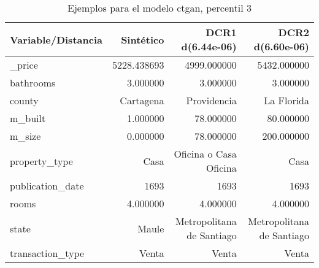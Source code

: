 \begin{table}[H]
\centering
\fontsize{10}{14}\selectfont
\caption{Ejemplos para el modelo ctgan, percentil 3}
\label{table-example-economicos-a-3-ctgan-3p}
\begin{tabular}{|l|r|r|r|}
\hline
\rowcolor[gray]{0.8}
Variable/Distancia & Sintético & DCR1 d(6.44e-06) & DCR2 d(6.60e-06) \\
\hline \_price & \cellcolor[rgb]{0.9, 0.54, 0.52} 5228.438693 & 4999.000000 & 5432.000000 \\
\hline bathrooms & \cellcolor[rgb]{0.9, 0.54, 0.52} 3.000000 & \cellcolor[rgb]{0.9, 0.54, 0.52} 3.000000 & \cellcolor[rgb]{0.9, 0.54, 0.52} 3.000000 \\
\hline county & \cellcolor[rgb]{0.9, 0.54, 0.52} Cartagena & Providencia & La Florida \\
\hline m\_built & \cellcolor[rgb]{0.9, 0.54, 0.52} 1.000000 & 78.000000 & 80.000000 \\
\hline m\_size & \cellcolor[rgb]{0.9, 0.54, 0.52} 0.000000 & 78.000000 & 200.000000 \\
\hline property\_type & \cellcolor[rgb]{0.9, 0.54, 0.52} Casa & Oficina o Casa Oficina & \cellcolor[rgb]{0.9, 0.54, 0.52} Casa \\
\hline publication\_date & \cellcolor[rgb]{0.9, 0.54, 0.52} 1693 & \cellcolor[rgb]{0.9, 0.54, 0.52} 1693 & \cellcolor[rgb]{0.9, 0.54, 0.52} 1693 \\
\hline rooms & \cellcolor[rgb]{0.9, 0.54, 0.52} 4.000000 & \cellcolor[rgb]{0.9, 0.54, 0.52} 4.000000 & \cellcolor[rgb]{0.9, 0.54, 0.52} 4.000000 \\
\hline state & \cellcolor[rgb]{0.9, 0.54, 0.52} Maule & Metropolitana de Santiago & Metropolitana de Santiago \\
\hline transaction\_type & \cellcolor[rgb]{0.9, 0.54, 0.52} Venta & \cellcolor[rgb]{0.9, 0.54, 0.52} Venta & \cellcolor[rgb]{0.9, 0.54, 0.52} Venta \\
\hline
\end{tabular}
\end{table}
